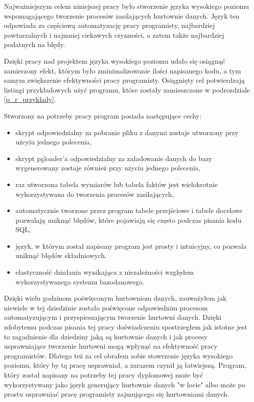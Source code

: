 Najważniejszym celem niniejszej pracy było stworzenie języka wysokiego poziomu wspomagającego 
 tworzenie procesów zasilających hurtownie danych.
Język ten odpowiada za częściową automatyzację pracy programisty, najbardziej powtarzalnych i najmniej ciekawych 
czynności, a zatem także najbardziej podatnych na błędy.

Dzięki pracy nad projektem języka wysokiego poziomu udało się osiągnąć zamierzony efekt,
 którym było zminimalizowanie ilości napisanego kodu,
 a tym samym zwiększenie efektywności pracy programisty. 
Osiągnięty cel potwierdzają listingi przykładowych użyć programu,
 które zostały zamieszczone w podrozdziale \ref{p_r_przyklady}. 

Stworzony na potrzeby pracy program posiada następujące cechy:

\begin{itemize} 
\item skrypt odpowiedzialny za pobranie pliku z danymi zostaje utworzony przy użcyiu jednego polecenia,
\item skrypt pgloader'a odpowiedzialny za załadowanie danych do bazy wygenerowany zostaje również przy użyciu jednego polecenia,
\item raz utworzona tabela wymiarów lub tabela faktów jest wielokrotnie wykorzystywana do tworzenia procesów zasilających,
\item automatycznie tworzone przez program tabele przejściowe i tabele docelowe pozwalają uniknąć błędów, które pojawiają
      się często podczas pisania kodu SQL,
\item język, w którym został napisany program jest prosty i intuicyjny, co pozwala uniknąć błędów składniowych.
\item elastyczność działania wynikająca z niezależności względem wykorzystywanego systemu bazodanowego. 
\end{itemize}

Dzięki wielu godzinom poświęconym hurtowniom danych,
 zauważyłem jak niewiele w tej dziedzinie zostało poświęcone odpowiednim procesom
automatyzującym i przyspieszającym tworzenie hurtowni danych.
Dzięki zdobytemu podczas pisania tej pracy doświadczeniu spostrzegłem
 jak istotne jest to zagadnienie dla dziedziny jaką są hurtownie danych i jak procesy usprawniające tworzenie hurtowni mogą wpłynąć
 na efektywność pracy programistów.
Dlatego też za cel obrałem sobie stowrzenie języka wysokiego poziomu, który by tą pracę usprawniał, 
a zarazem czynił ją łatwiejszą. Program, który został napisany na potrzeby tej pracy dyplomowej może być wykorzystywany 
jako język generujący hurtownie danych "w locie" albo może po prostu usprawniać pracę programisty zajmującego się hurtowniami danych.

